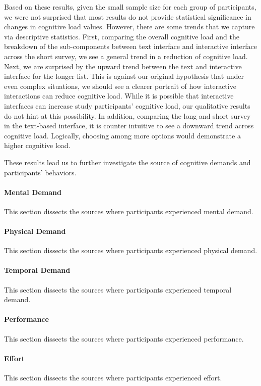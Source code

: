 Based on these results, given the small sample size for each group of participants, we were not surprised that most results do not provide statistical significance in changes in cognitive load values. However, there are some trends that we capture via descriptive statistics. First, comparing the overall cognitive load and the breakdown of the sub-components between text interface and interactive interface across the short survey, we see a general trend in a reduction of cognitive load. Next, we are surprised by the upward trend between the text and interactive interface for the longer list. This is against our original hypothesis that under even complex situations, we should see a clearer portrait of how interactive interactions can reduce cognitive load. While it is possible that interactive interfaces can increase study participants' cognitive load, our qualitative results do not hint at this possibility. In addition, comparing the long and short survey in the text-based interface, it is counter intuitive to see a downward trend across cognitive load. Logically, choosing among more options would demonstrate a higher cognitive load.

These results lead us to further investigate the source of cognitive demands and participants' behaviors.

\paragraph{Mental Demand} This section dissects the sources where participants experienced mental demand.
\paragraph{Physical Demand} This section dissects the sources where participants experienced physical demand.
\paragraph{Temporal Demand} This section dissects the sources where participants experienced temporal demand.
\paragraph{Performance} This section dissects the sources where participants experienced performance.
\paragraph{Effort} This section dissects the sources where participants experienced effort.
